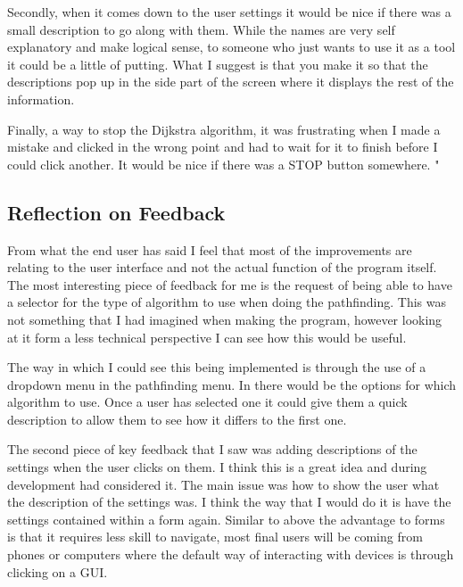 \begin{FlushLeft}
\begin{enumerate}
        Secondly, when it comes down to the user settings it would be nice if there was a small description to go along with them. While the names are very self explanatory and make logical sense, to someone who just wants to use it as a tool it could be a little of putting. What I suggest is that you make it so that the descriptions pop up in the side part of the screen where it displays the rest of the information.  \\ \bk

        Finally, a way to stop the Dijkstra algorithm, it was frustrating when I made a mistake and clicked in the wrong point and had to wait for it to finish before I could click another. It would be nice if there was a STOP button somewhere.        "
    \end{enumerate}
    \BK

    \subsection{Reflection on Feedback}
    From what the end user has said I feel that most of the improvements are relating to the user interface and not the actual function of the program itself. The most interesting piece of feedback for me is the request of being able to have a selector for the type of algorithm to use when doing the pathfinding. This was not something that I had imagined when making the program, however looking at it form a less technical perspective I can see how this would be useful. \\ \bk

    The way in which I could see this being implemented is through the use of a dropdown menu in the pathfinding menu. In there would be the options for which algorithm to use. Once a user has selected one it could give them a quick description to allow them to see how it differs to the first one. \\ \bk

    The second piece of key feedback that I saw was adding descriptions of the settings when the user clicks on them. I think this is a great idea and during development had considered it. The main issue was how to show the user what the description of the settings was. I think the way that I would do it is have the settings contained within a form again. Similar to above the advantage to forms is that it requires less skill to navigate, most final users will be coming from phones or computers where the default way of interacting with devices is through clicking on a GUI. \\ \bk


\end{FlushLeft}

